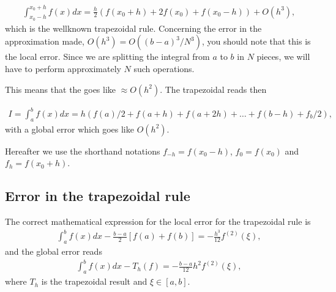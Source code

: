 \documentclass[letterpaper,10pt,english]{sphinxmanual}
\begin{document}
\begin{equation*}
\begin{split}
\begin{equation}
   \int_{x_0-h}^{x_0+h}f(x)dx=\frac{h}{2}\left(f(x_0+h) + 2f(x_0) + f(x_0-h)\right)+O(h^3),
\label{eq:trapez} \tag{20}
\end{equation}
\end{split}
\end{equation*}
which is the well\sphinxhyphen{}known trapezoidal rule.  Concerning the error in the approximation made,
\(O(h^3)=O((b-a)^3/N^3)\), you should  note
that this is the local error.  Since we are splitting the integral from
\(a\) to \(b\) in \(N\) pieces, we will have to perform approximately \(N\)
such operations.

This means that the  goes like \(\approx O(h^2)\).
The trapezoidal reads then




\begin{equation*}
\begin{split}
\begin{equation}
   I=\int_a^bf(x) dx=h\left(f(a)/2 + f(a+h) +f(a+2h)+
                          \dots +f(b-h)+ f_{b}/2\right),
\label{eq:trapez1} \tag{21}
\end{equation}
\end{split}
\end{equation*}
with a global error which goes like \(O(h^2)\).

Hereafter we use the shorthand notations \(f_{-h}=f(x_0-h)\), \(f_{0}=f(x_0)\)
and \(f_{h}=f(x_0+h)\).




\subsection{Error in the trapezoidal rule}
\label{\detokenize{chapter3:error-in-the-trapezoidal-rule}}
The correct mathematical expression for the local error for the trapezoidal rule is
\begin{equation*}
\begin{split}
\int_a^bf(x)dx -\frac{b-a}{2}\left[f(a)+f(b)\right]=-\frac{h^3}{12}f^{(2)}(\xi),
\end{split}
\end{equation*}
and the global error reads
\begin{equation*}
\begin{split}
\int_a^bf(x)dx -T_h(f)=-\frac{b-a}{12}h^2f^{(2)}(\xi),
\end{split}
\end{equation*}
where \(T_h\) is the trapezoidal result and \(\xi \in [a,b]\).
\end{document}

